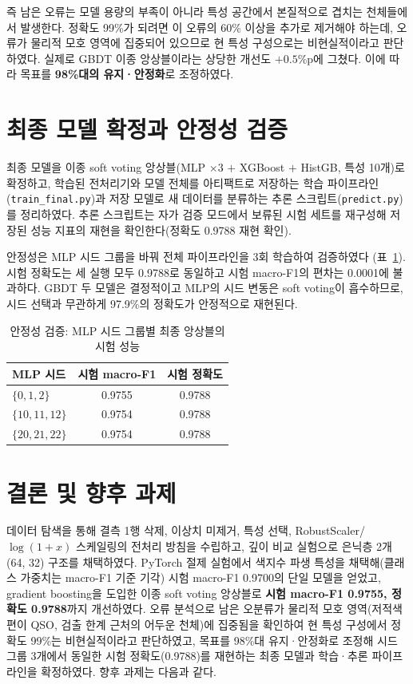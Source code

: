 \documentclass[11pt,a4paper]{article}
\begin{document}
즉 남은 오류는 모델 용량의 부족이 아니라 특성 공간에서 본질적으로 겹치는
천체들에서 발생한다. 정확도 99\%가 되려면 이 오류의 60\% 이상을 추가로 제거해야
하는데, 오류가 물리적 모호 영역에 집중되어 있으므로 현 특성 구성으로는
비현실적이라고 판단하였다. 실제로 GBDT 이종 앙상블이라는 상당한 개선도
$+0.5$\%p에 그쳤다. 이에 따라 목표를 \textbf{98\%대의 유지·안정화}로 조정하였다.

\section{최종 모델 확정과 안정성 검증}

최종 모델을 이종 soft voting 앙상블(MLP $\times 3$ $+$ XGBoost $+$ HistGB,
특성 10개)로 확정하고, 학습된 전처리기와 모델 전체를 아티팩트로 저장하는 학습
파이프라인(\texttt{train\_final.py})과 저장 모델로 새 데이터를 분류하는 추론
스크립트(\texttt{predict.py})를 정리하였다. 추론 스크립트는 자가 검증 모드에서
보류된 시험 세트를 재구성해 저장된 성능 지표의 재현을 확인한다(정확도 0.9788
재현 확인).

안정성은 MLP 시드 그룹을 바꿔 전체 파이프라인을 3회 학습하여 검증하였다
(표~\ref{tab:stability}). 시험 정확도는 세 실행 모두 0.9788로 동일하고 시험
macro-F1의 편차는 0.0001에 불과하다. GBDT 두 모델은 결정적이고 MLP의 시드
변동은 soft voting이 흡수하므로, 시드 선택과 무관하게 97.9\%의 정확도가
안정적으로 재현된다.

\begin{table}[htbp]
\centering
\caption{안정성 검증: MLP 시드 그룹별 최종 앙상블의 시험 성능}
\label{tab:stability}
\small
\begin{tabular}{lcc}
\toprule
MLP 시드 & 시험 macro-F1 & 시험 정확도 \\
\midrule
$\{0, 1, 2\}$ & 0.9755 & 0.9788 \\
$\{10, 11, 12\}$ & 0.9754 & 0.9788 \\
$\{20, 21, 22\}$ & 0.9754 & 0.9788 \\
\bottomrule
\end{tabular}
\end{table}

\section{결론 및 향후 과제}

데이터 탐색을 통해 결측 1행 삭제, 이상치 미제거, 특성 선택,
RobustScaler/$\log(1+x)$ 스케일링의 전처리 방침을 수립하고, 깊이 비교 실험으로
은닉층 2개 (64, 32) 구조를 채택하였다. PyTorch 절제 실험에서 색지수 파생 특성을
채택해(클래스 가중치는 macro-F1 기준 기각) 시험 macro-F1 0.9700의 단일 모델을
얻었고, gradient boosting을 도입한 이종 soft voting 앙상블로 \textbf{시험
macro-F1 0.9755, 정확도 0.9788}까지 개선하였다. 오류 분석으로 남은 오분류가
물리적 모호 영역(저적색편이 QSO, 검출 한계 근처의 어두운 천체)에 집중됨을
확인하여 현 특성 구성에서 정확도 99\%는 비현실적이라고 판단하였고, 목표를
98\%대 유지·안정화로 조정해 시드 그룹 3개에서 동일한 시험 정확도(0.9788)를
재현하는 최종 모델과 학습·추론 파이프라인을 확정하였다. 향후 과제는 다음과 같다.
\end{document}
